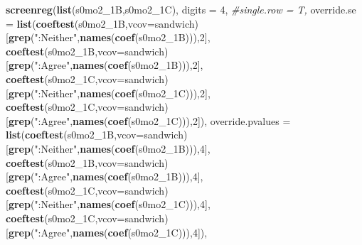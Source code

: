 \documentclass[
]{article}
\newenvironment{Shaded}{\begin{snugshade}}{\end{snugshade}}
\newcommand{\CommentTok}[1]{\textcolor[rgb]{0.56,0.35,0.01}{\textit{#1}}}
\newcommand{\DataTypeTok}[1]{\textcolor[rgb]{0.13,0.29,0.53}{#1}}
\newcommand{\DecValTok}[1]{\textcolor[rgb]{0.00,0.00,0.81}{#1}}
\newcommand{\KeywordTok}[1]{\textcolor[rgb]{0.13,0.29,0.53}{\textbf{#1}}}
\newcommand{\NormalTok}[1]{#1}
\newcommand{\StringTok}[1]{\textcolor[rgb]{0.31,0.60,0.02}{#1}}
\begin{document}
\begin{Shaded}
\begin{Highlighting}[]
\KeywordTok{screenreg}\NormalTok{(}\KeywordTok{list}\NormalTok{(s0mo2_1B,s0mo2_1C), }\DataTypeTok{digits =} \DecValTok{4}\NormalTok{, }\CommentTok{#single.row = T,}
          \DataTypeTok{override.se =} \KeywordTok{list}\NormalTok{(}\KeywordTok{coeftest}\NormalTok{(s0mo2_1B,}\DataTypeTok{vcov=}\NormalTok{sandwich)[}\KeywordTok{grep}\NormalTok{(}\StringTok{":Neither"}\NormalTok{,}\KeywordTok{names}\NormalTok{(}\KeywordTok{coef}\NormalTok{(s0mo2_1B))),}\DecValTok{2}\NormalTok{],}
                             \KeywordTok{coeftest}\NormalTok{(s0mo2_1B,}\DataTypeTok{vcov=}\NormalTok{sandwich)[}\KeywordTok{grep}\NormalTok{(}\StringTok{":Agree"}\NormalTok{,}\KeywordTok{names}\NormalTok{(}\KeywordTok{coef}\NormalTok{(s0mo2_1B))),}\DecValTok{2}\NormalTok{],}
                             \KeywordTok{coeftest}\NormalTok{(s0mo2_1C,}\DataTypeTok{vcov=}\NormalTok{sandwich)[}\KeywordTok{grep}\NormalTok{(}\StringTok{":Neither"}\NormalTok{,}\KeywordTok{names}\NormalTok{(}\KeywordTok{coef}\NormalTok{(s0mo2_1C))),}\DecValTok{2}\NormalTok{],}
                             \KeywordTok{coeftest}\NormalTok{(s0mo2_1C,}\DataTypeTok{vcov=}\NormalTok{sandwich)[}\KeywordTok{grep}\NormalTok{(}\StringTok{":Agree"}\NormalTok{,}\KeywordTok{names}\NormalTok{(}\KeywordTok{coef}\NormalTok{(s0mo2_1C))),}\DecValTok{2}\NormalTok{]),}
          \DataTypeTok{override.pvalues =} \KeywordTok{list}\NormalTok{(}\KeywordTok{coeftest}\NormalTok{(s0mo2_1B,}\DataTypeTok{vcov=}\NormalTok{sandwich)[}\KeywordTok{grep}\NormalTok{(}\StringTok{":Neither"}\NormalTok{,}\KeywordTok{names}\NormalTok{(}\KeywordTok{coef}\NormalTok{(s0mo2_1B))),}\DecValTok{4}\NormalTok{],}
                                  \KeywordTok{coeftest}\NormalTok{(s0mo2_1B,}\DataTypeTok{vcov=}\NormalTok{sandwich)[}\KeywordTok{grep}\NormalTok{(}\StringTok{":Agree"}\NormalTok{,}\KeywordTok{names}\NormalTok{(}\KeywordTok{coef}\NormalTok{(s0mo2_1B))),}\DecValTok{4}\NormalTok{],}
                                  \KeywordTok{coeftest}\NormalTok{(s0mo2_1C,}\DataTypeTok{vcov=}\NormalTok{sandwich)[}\KeywordTok{grep}\NormalTok{(}\StringTok{":Neither"}\NormalTok{,}\KeywordTok{names}\NormalTok{(}\KeywordTok{coef}\NormalTok{(s0mo2_1C))),}\DecValTok{4}\NormalTok{],}
                                  \KeywordTok{coeftest}\NormalTok{(s0mo2_1C,}\DataTypeTok{vcov=}\NormalTok{sandwich)[}\KeywordTok{grep}\NormalTok{(}\StringTok{":Agree"}\NormalTok{,}\KeywordTok{names}\NormalTok{(}\KeywordTok{coef}\NormalTok{(s0mo2_1C))),}\DecValTok{4}\NormalTok{]),}

\end{Highlighting}
\end{Shaded}
\end{document}
